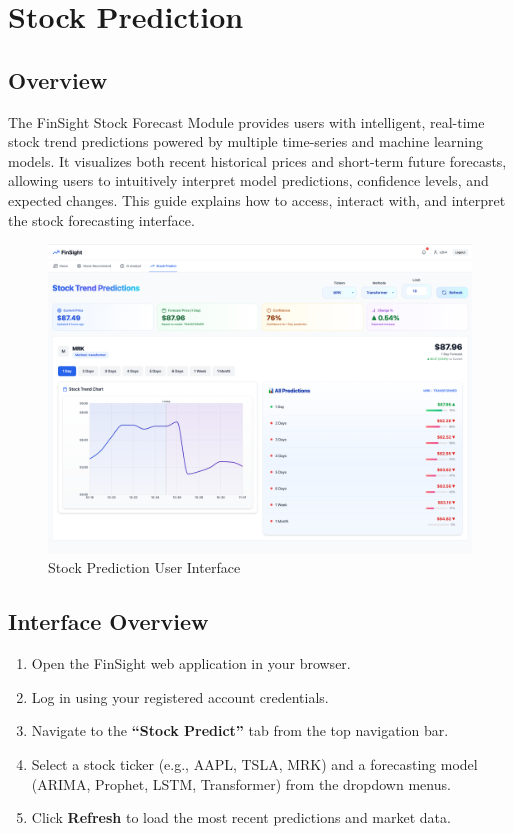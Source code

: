 \section{Stock Prediction}

\subsection{Overview}

The FinSight Stock Forecast Module provides users with intelligent, real-time stock trend predictions powered by multiple time-series and machine learning models.  
It visualizes both recent historical prices and short-term future forecasts, allowing users to intuitively interpret model predictions, confidence levels, and expected changes.  
This guide explains how to access, interact with, and interpret the stock forecasting interface.

\begin{figure}[H]
    \centering
    \includegraphics[width=1\linewidth]{images/prediction/overview.png}
    \caption{Stock Prediction User Interface}

\end{figure}

\subsection{Interface Overview}

\begin{enumerate}
  \item Open the FinSight web application in your browser.
  \item Log in using your registered account credentials.
  \item Navigate to the \textbf{“Stock Predict”} tab from the top navigation bar.
  \item Select a stock ticker (e.g., AAPL, TSLA, MRK) and a forecasting model (ARIMA, Prophet, LSTM, Transformer) from the dropdown menus.
  \item Click \textbf{Refresh} to load the most recent predictions and market data.
\end{enumerate}


